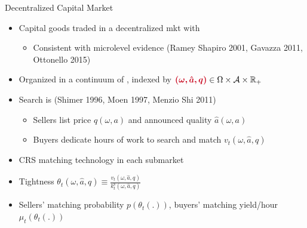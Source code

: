 \documentclass[english,xcolor=svgnames,aspectratio=169]{beamer}
\newcommand{\Search}{^{\mathrm{s}}}
\begin{document}
\begin{frame}{Decentralized Capital Market}

\begin{itemize}

\item Capital goods traded in a decentralized mkt with {\color{dblue}{\bf search-and-matching frictions}} \smallskip

\begin{itemize}

\item Consistent with microlevel evidence {\scriptsize{(Ramey Shapiro 2001, Gavazza 2011, Ottonello 2015)}}

\end{itemize} \medskip



\item Organized in a continuum of {\color{dred}{submarkets}}, indexed by ${\color{dred}{\boldsymbol {(\omega, \hat a, q)}}}\in \Omega \times \mathcal A \times \mathbb R_{+} $ \medskip

\item Search is {\color{dred}{directed}} {\scriptsize{(Shimer 1996, Moen 1997, Menzio Shi 2011)}} \smallskip

\begin{itemize}

\item Sellers list price $q(\omega,a)$ and announced quality $\hat{a}(\omega,a)$ \smallskip

\item Buyers dedicate hours of work to search and match $v_{t}(\omega, \hat a, q)$ \medskip

\end{itemize}

\item CRS matching technology in each submarket %
\medskip

\item Tightness $\theta _{t}(\omega, \hat a, q)\equiv \frac{v_{t}(\omega, \hat a, q)}{k\Search_{t}(\omega, \hat a, q)}$ \medskip

\item Sellers' matching probability $p(\theta_{t}(.))$, buyers' matching yield/hour $\mu_{t}(\theta_{t}(.))$
\end{itemize}

\end{frame}
\end{document}
